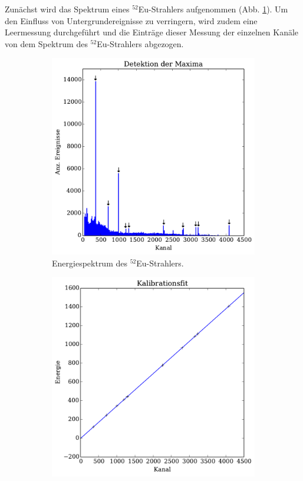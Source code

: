 Zunächst wird das Spektrum eines $^{52}$Eu-Strahlers aufgenommen (Abb.
\ref{fig:eu_uncalibrated}).
Um den Einfluss von Untergrundereignisse zu verringern, wird zudem eine
Leermessung durchgeführt und die Einträge dieser Messung der einzelnen Kanäle
von dem Spektrum des $^{52}$Eu-Strahlers abgezogen.
\begin{figure}[htb]
    \centering
    \begin{subfigure}{.49\linewidth}
        \includegraphics[width=1.0\linewidth]{img/02_maxima.pdf}
        \caption{
            Energiespektrum des $^{52}$Eu-Strahlers.
        }
        \label{fig:eu_uncalibrated}
    \end{subfigure}%
    \begin{subfigure}{.49\linewidth}
        \includegraphics[width=1.0\linewidth]{img/03_calibration.pdf}

\end{subfigure}
\end{figure}
